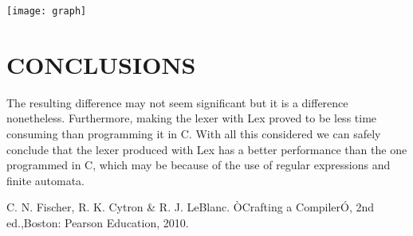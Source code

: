 \documentclass[letterpaper, 10 pt, conference]{ieeeconf}  %
\begin{document}
\texttt{[image: graph]}

\section{CONCLUSIONS}

The resulting difference may not seem significant but it is a difference nonetheless. Furthermore, making the lexer with Lex proved to be less time consuming than programming it in C. With all this considered we can safely conclude that the lexer produced with Lex has a better performance than the one programmed in C, which may be because of the use of regular expressions and finite automata.


\addtolength{\textheight}{-12cm}   %









\begin{thebibliography}{99}

 C. N. Fischer, R. K. Cytron \& R. J. LeBlanc. ÒCrafting a CompilerÓ, 2nd ed.,Boston: Pearson Education, 2010.

\end{thebibliography}
\end{document}
